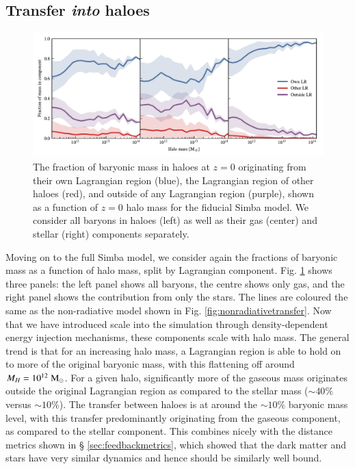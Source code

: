 \documentclass[fleqn,usenatbib]{mnras}
\newcommand{\msolar}{\;{\rm M}_{\odot}}
\newcommand{\simba}{{\sc Simba}}
\begin{document}
\subsection{Transfer \emph{into} haloes}
\label{sec:transferinto}


\begin{figure}
	\centering
	\includegraphics{figures/s50j7kAHF/component_fraction_mixed.pdf}
	\vspace{-0.7cm}
	\caption{
  The fraction of baryonic mass in haloes at $z=0$ originating from their own
  Lagrangian region (blue), the Lagrangian region of other haloes (red), and
  outside of any Lagrangian region (purple), shown as a function of $z=0$
  halo mass for the fiducial \simba{} model. We consider all baryons in
  haloes (left) as well as their gas (center) and stellar (right) components
  separately.
	}
	\label{fig:maintransferresult}
\end{figure}

Moving on to the full \simba{} model, we consider again the fractions of
baryonic mass as a function of halo mass, split by Lagrangian component. Fig.
\ref{fig:maintransferresult} shows three panels: the left panel shows all
baryons, the centre shows only gas, and the right panel shows the
contribution from only the stars. The lines are coloured the same as the
non-radiative model shown in Fig. \ref{fig:nonradiativetransfer}. Now that we
have introduced scale into the simulation through density-dependent energy
injection mechanisms, these components scale with halo mass. The general
trend is that for an increasing halo mass, a Lagrangian region is able to
hold on to more of the original baryonic mass, with this flattening off
around $M_H = 10^{12} \msolar$. For a given halo, significantly more of the
gaseous mass originates outside the original Lagrangian region as compared to
the stellar mass ($\sim 40 \%$ versus $\sim 10 \%$). The transfer between
haloes is at around the $\sim 10\%$ baryonic mass level, with this transfer
predominantly originating from the gaseous component, as compared to the
stellar component. This combines nicely with the distance metrics shown in \S
\ref{sec:feedbackmetrics}, which showed that the dark matter and stars have
very similar dynamics and hence should be similarly well bound.
\end{document}
